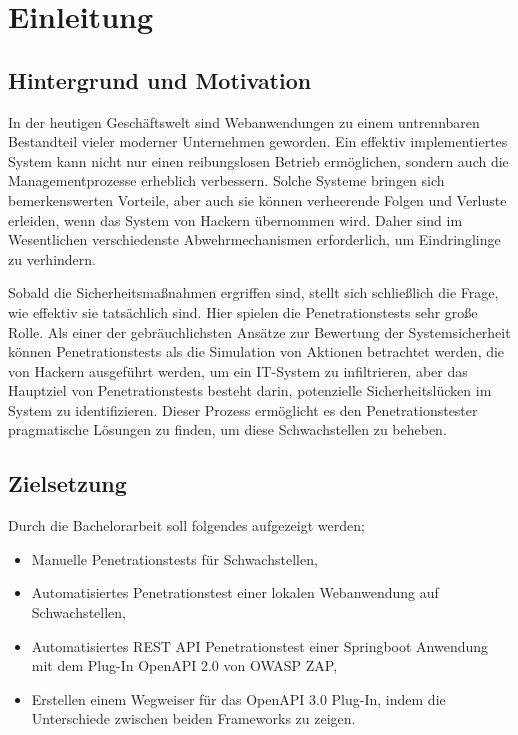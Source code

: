 \chapter{Einleitung}
\label{cha:Einleitung}

\section{Hintergrund und Motivation}

In der heutigen Geschäftswelt sind Webanwendungen zu einem untrennbaren Bestandteil vieler moderner Unternehmen geworden. Ein effektiv implementiertes System kann nicht nur einen reibungslosen Betrieb ermöglichen, sondern auch die Managementprozesse erheblich verbessern. Solche Systeme bringen sich bemerkenswerten Vorteile, aber auch sie können verheerende Folgen und Verluste erleiden, wenn das System von Hackern übernommen wird. Daher sind im Wesentlichen verschiedenste Abwehrmechanismen erforderlich, um Eindringlinge zu verhindern.

Sobald die Sicherheitsmaßnahmen ergriffen sind, stellt sich schließlich die Frage, wie effektiv sie tatsächlich sind. Hier spielen die Penetrationstests sehr große Rolle. Als einer der gebräuchlichsten Ansätze zur Bewertung der Systemsicherheit können Penetrationstests als die Simulation von Aktionen betrachtet werden, die von Hackern ausgeführt werden, um ein IT-System zu infiltrieren, aber das Hauptziel von Penetrationstests besteht darin, potenzielle Sicherheitslücken im System zu identifizieren. Dieser Prozess ermöglicht es den Penetrationstester pragmatische Lösungen zu finden, um diese Schwachstellen zu beheben.

\section{Zielsetzung}

Durch die Bachelorarbeit soll folgendes aufgezeigt werden;

\begin{itemize}
	\item Manuelle Penetrationstests für Schwachstellen,
	\item Automatisiertes Penetrationstest einer lokalen Webanwendung auf Schwachstellen,
	\item Automatisiertes REST API Penetrationstest einer Springboot Anwendung mit dem Plug-In OpenAPI 2.0 von OWASP ZAP,
	\item Erstellen einem Wegweiser für das OpenAPI 3.0 Plug-In, indem die Unterschiede zwischen beiden Frameworks zu zeigen.\\
\end{itemize}

